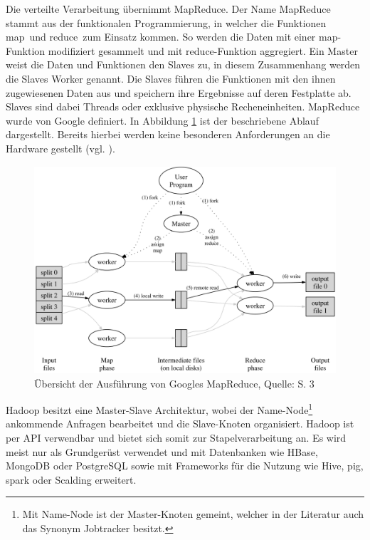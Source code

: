 Die verteilte Verarbeitung übernimmt MapReduce.
Der Name MapReduce stammt aus der funktionalen Programmierung, in welcher die Funktionen \glqq map\grqq \ und \glqq reduce\grqq \ zum Einsatz kommen.
So werden die Daten mit einer map-Funktion modifiziert gesammelt und mit reduce-Funktion aggregiert.
Ein Master weist die Daten und Funktionen den Slaves zu, in diesem Zusammenhang werden die Slaves Worker genannt.
Die Slaves führen die Funktionen mit den ihnen zugewiesenen Daten aus und speichern ihre Ergebnisse auf deren Festplatte ab.
Slaves sind dabei Threads oder exklusive physische Recheneinheiten.
MapReduce wurde von Google definiert.
In Abbildung \ref{fig:mapreduce} ist der beschriebene Ablauf dargestellt.
Bereits hierbei werden keine besonderen Anforderungen an die Hardware gestellt (vgl. \cite[S.3]{paper:mapreduce}).
%
\begin{figure}[h!]
\centering
\includegraphics[width=\textwidth]{Abbildungen/mapreduce.png}
\caption[Übersicht der Ausführung von Googles MapReduce]{Übersicht der Ausführung von Googles MapReduce, Quelle: \cite{paper:mapreduce} S. 3}
\label{fig:mapreduce}
\end{figure}
Hadoop besitzt eine Master-Slave Architektur, wobei der Name-Node\footnote{Mit Name-Node ist der Master-Knoten gemeint, welcher in der Literatur auch das Synonym Jobtracker besitzt.} ankommende Anfragen bearbeitet und die Slave-Knoten organisiert.
Hadoop ist per API verwendbar und bietet sich somit zur Stapelverarbeitung an. %
Es wird meist nur als Grundgerüst verwendet und mit Datenbanken wie HBase, MongoDB oder PostgreSQL sowie mit Frameworks für die Nutzung wie Hive, \Gls{pig}, \Gls{spark} oder Scalding erweitert.

